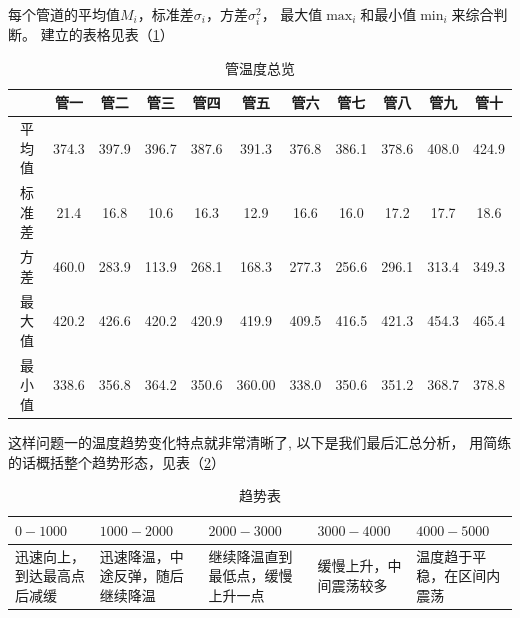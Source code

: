         每个管道的平均值$M_i$，标准差$\sigma_i$，方差$\sigma_i^2$，
        最大值$\max_i$和最小值$\min_i$来综合判断。
        建立的表格见表（\ref{stats_for_temper}）
        \begin{table}
            \centering
            \begin{tabular}{ c|c|c|c|c|c|c|c|c|c|c  }
                \hline
                &管一&管二&管三&管四&管五&管六&管七&管八&管九&管十\\
                \hline
                平均值&374.3&  397.9& 396.7  &387.6 & 391.3 & 376.8  &386.1 & 378.6 & 408.0 & 424.9\\
                标准差&21.4 &  16.8 &  10.6 &  16.3 &  12.9 &  16.6  & 16.0  & 17.2 & 17.7  & 18.6 \\
                方差  &460.0& 283.9 & 113.9  &268.1 & 168.3 & 277.3 & 256.6 & 296.1 & 313.4 & 349.3\\
                最大值&420.2& 426.6 & 420.2 & 420.9 & 419.9 & 409.5 & 416.5 & 421.3 & 454.3 & 465.4\\
                最小值&338.6& 356.8 & 364.2 & 350.6 & 360.00& 338.0& 350.6 & 351.2 & 368.7 & 378.8 \\
                \hline
            \end{tabular}
            \caption{管温度总览}
            \label{stats_for_temper}
        \end{table}
        这样问题一的温度趋势变化特点就非常清晰了,
        以下是我们最后汇总分析，
        用简练的话概括整个趋势形态，见表（\ref{1_conclusion}）
        \begin{table}
            \centering
            \begin{tabular}{ |p{2.5cm}<{\centering}|p{2.5cm}<{\centering}|p{2.5cm}<{\centering}|p{2.5cm}<{\centering}|p{2.5cm}<{\centering}|  }
                \hline
                $0-1000$&$1000-2000$&$2000-3000$&$3000-4000$&$4000-5000$\\
                \hline
                迅速向上，到达最高点后减缓&
                迅速降温，中途反弹，随后继续降温&
                继续降温直到最低点，缓慢上升一点&
                缓慢上升，中间震荡较多&
                温度趋于平稳，在区间内震荡\\
                \hline
            \end{tabular}
            \caption{趋势表}
            \label{1_conclusion}
        \end{table}

